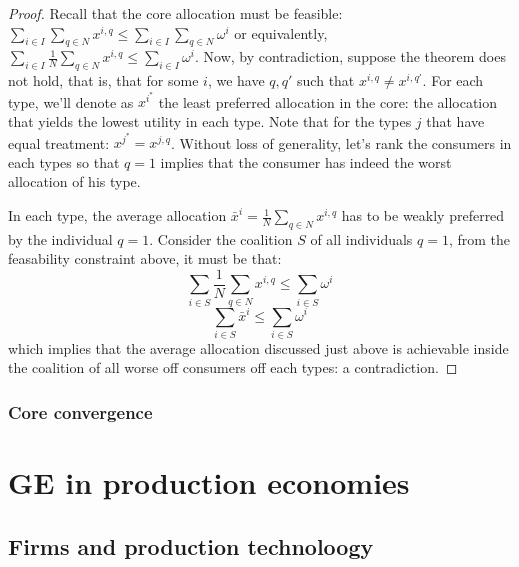 \documentclass[12pt]{report}
\begin{document}
\begin{proof}
Recall that the core allocation must be feasible: $\sum_{i\in I}\sum_{q\in N} x^{i,q} \leq \sum_{i\in I}\sum_{q\in N} \omega^{i}$ or equivalently, $ \sum_{i\in I}\frac{1}{N}\sum_{q\in N} x^{i,q} \leq \sum_{i\in I} \omega^{i}$. Now, by contradiction, suppose the theorem does not hold, that is, that for some $i$, we have $q,q'$ such that $x^{i,q} \neq x^{i,q'}$. For each type, we'll denote as $x^{i^*}$ the least preferred allocation in the core: the allocation that yields the lowest utility in each type. Note that for the types $j$ that have equal treatment: $x^{j^*} = x^{j,q}$. Without loss of generality, let's rank the consumers in each types so that $q=1$ implies that the consumer has indeed the worst allocation of his type.

In each type, the average allocation $\bar x^i = \frac{1}{N} \sum_{q\in N} x^{i,q} $ has to be weakly preferred by the individual $q=1$. Consider the coalition $S$ of all individuals $q=1$, from the feasability constraint above, it must be that: $$ \sum_{i\in S}\frac{1}{N}\sum_{q\in N} x^{i,q} \leq \sum_{i\in S} \omega^{i} $$ $$\sum_{i\in S} \bar x^{i} \leq \sum_{i\in S} \omega^{i} $$ which implies that the average allocation discussed just above is achievable inside the coalition of all worse off consumers off each types: a contradiction.
\end{proof}

\subsection{Core convergence}



\chapter{GE in production economies}

\section{Firms and production technoloogy}
\end{document}
